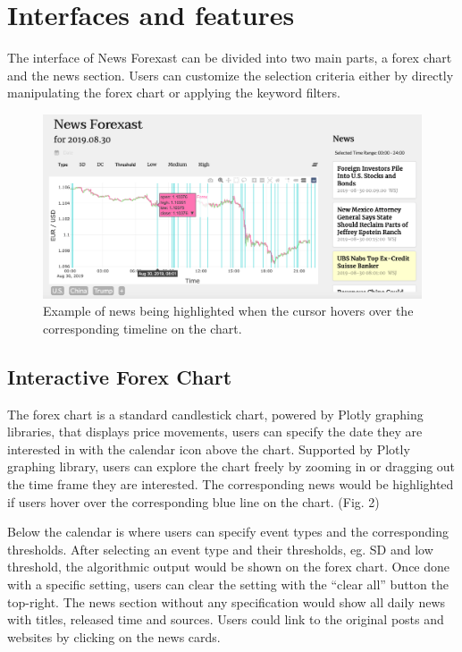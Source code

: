\documentclass[sigconf]{acmart}
\begin{document}
\section{Interfaces and features}
The interface of News Forexast can be divided into two main parts, a forex chart and the news section. Users can customize the selection criteria either by directly manipulating the forex chart or applying the keyword filters.

\begin{figure}[h]
  \centering
  \includegraphics[width=\linewidth]{hover.png}
  \caption{Example of news being highlighted when the cursor hovers over the corresponding timeline on the chart.}
  \Description{}
\end{figure}

\subsection{Interactive Forex Chart}
The forex chart is a standard candlestick chart, powered by Plotly graphing libraries\cite{Plotly}, that displays price movements, users can specify the date they are interested in with the calendar icon above the chart. Supported by Plotly graphing library, users can explore the chart freely by zooming in or dragging out the time frame they are interested. The corresponding news would be highlighted if users hover over the corresponding blue line on the chart. (Fig. 2)


Below the calendar is where users can specify event types and the corresponding thresholds. After selecting an event type and their thresholds, eg. SD and low threshold,  the algorithmic output would be shown on the forex chart. Once done with a specific setting, users can clear the setting with the “clear all” button the top-right. The news section without any specification would show all daily news with titles, released time and sources. Users could link to the original posts and websites by clicking on the news cards. 
\end{document}
